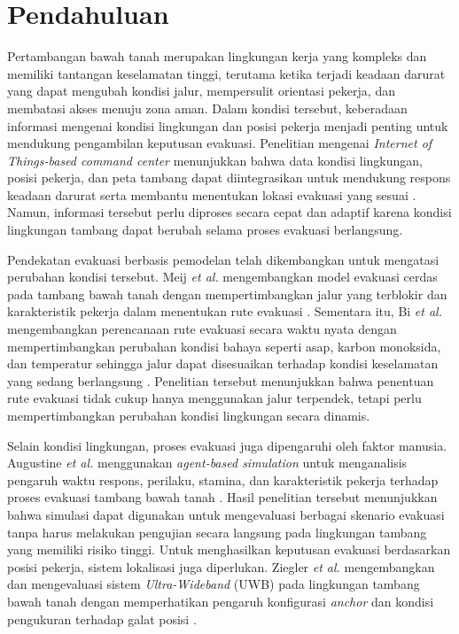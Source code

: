 \documentclass[10pt,a4paper]{article}
\begin{document}
\section*{Pendahuluan}
Pertambangan bawah tanah merupakan lingkungan kerja yang kompleks dan memiliki tantangan keselamatan tinggi, terutama ketika terjadi keadaan darurat yang dapat mengubah kondisi jalur, mempersulit orientasi pekerja, dan membatasi akses menuju zona aman. Dalam kondisi tersebut, keberadaan informasi mengenai kondisi lingkungan dan posisi pekerja menjadi penting untuk mendukung pengambilan keputusan evakuasi. Penelitian mengenai \emph{Internet of Things-based command center} menunjukkan bahwa data kondisi lingkungan, posisi pekerja, dan peta tambang dapat diintegrasikan untuk mendukung respons keadaan darurat serta membantu menentukan lokasi evakuasi yang sesuai \cite{jha}. Namun, informasi tersebut perlu diproses secara cepat dan adaptif karena kondisi lingkungan tambang dapat berubah selama proses evakuasi berlangsung.

Pendekatan evakuasi berbasis pemodelan telah dikembangkan untuk mengatasi perubahan kondisi tersebut. Meij \emph{et al.} mengembangkan model evakuasi cerdas pada tambang bawah tanah dengan mempertimbangkan jalur yang terblokir dan karakteristik pekerja dalam menentukan rute evakuasi \cite{meij}. Sementara itu, Bi \emph{et al.} mengembangkan perencanaan rute evakuasi secara waktu nyata dengan mempertimbangkan perubahan kondisi bahaya seperti asap, karbon monoksida, dan temperatur sehingga jalur dapat disesuaikan terhadap kondisi keselamatan yang sedang berlangsung \cite{bi}. Penelitian tersebut menunjukkan bahwa penentuan rute evakuasi tidak cukup hanya menggunakan jalur terpendek, tetapi perlu mempertimbangkan perubahan kondisi lingkungan secara dinamis.

Selain kondisi lingkungan, proses evakuasi juga dipengaruhi oleh faktor manusia. Augustine \emph{et al.} menggunakan \emph{agent-based simulation} untuk menganalisis pengaruh waktu respons, perilaku, stamina, dan karakteristik pekerja terhadap proses evakuasi tambang bawah tanah \cite{augustine}. Hasil penelitian tersebut menunjukkan bahwa simulasi dapat digunakan untuk mengevaluasi berbagai skenario evakuasi tanpa harus melakukan pengujian secara langsung pada lingkungan tambang yang memiliki risiko tinggi. Untuk menghasilkan keputusan evakuasi berdasarkan posisi pekerja, sistem lokalisasi juga diperlukan. Ziegler \emph{et al.} mengembangkan dan mengevaluasi sistem \emph{Ultra-Wideband} (UWB) pada lingkungan tambang bawah tanah dengan memperhatikan pengaruh konfigurasi \emph{anchor} dan kondisi pengukuran terhadap galat posisi \cite{ziegler}.
\end{document}
